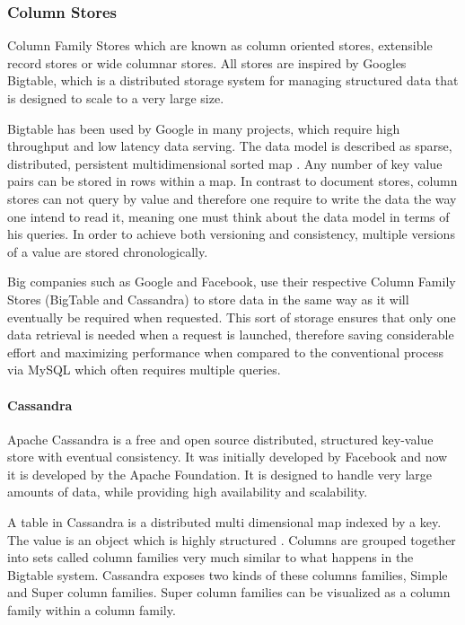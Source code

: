 \subsubsection{Column Stores}
Column Family Stores which are known as column oriented stores, extensible record stores or wide columnar stores. All stores are inspired by Googles Bigtable, which is a distributed storage system for managing structured data that is designed to scale to a very large size.\cite{Hecht:2011,Chang:2006} 

Bigtable has been used by Google in many projects, which require high throughput and low latency data serving. The data model is described as sparse, distributed, persistent multidimensional sorted map \cite{Chang:2006} . Any number of key value pairs can be stored in rows within a map. In contrast to document stores, column stores can not query by value and therefore one require to write the data the way one intend to read it, meaning one must think about the data model in terms of his queries. In order to achieve both versioning and consistency, multiple versions of a value are stored chronologically. 

Big companies such as Google and Facebook, use their respective Column Family Stores (BigTable and Cassandra) to store data in the same way as it will eventually be required when requested. This sort of storage  ensures that only one data retrieval is needed when a request is launched, therefore saving considerable effort and maximizing performance when compared to the conventional process via MySQL which often requires multiple queries.  

\paragraph{Cassandra}
Apache Cassandra is a free and open source distributed, structured key-value store with eventual consistency. It was initially developed by Facebook and now it is developed by the Apache Foundation. It is designed to handle very large amounts of data, while providing high availability and scalability.

A table in Cassandra is a distributed multi dimensional map indexed by a key. The value is an object which is highly structured \cite{biba2011learning}. Columns are grouped together into sets called column families very much similar to what happens in the Bigtable system. Cassandra exposes two kinds of these columns families, Simple and Super column families. Super column families can be visualized as a column family within a column family\cite{biba2011learning}.

